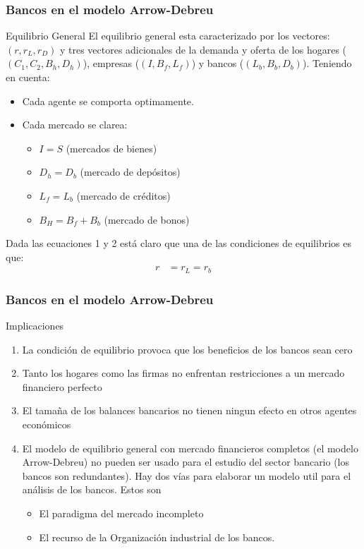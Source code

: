 \begin{frame}
    \frametitle{{\normalsize Bancos en el modelo Arrow-Debreu} {}}
    \begin{block} {Equilibrio General}
    El equilibrio general esta caracterizado por los vectores: $ (r, r_{L}, r_{D}) $ y tres vectores adicionales de la demanda y oferta de los hogares ($(C_{1}, C_{2}, B_{h}, D_{h}) $), empresas ($(I, B_{f}, L_{f}) $) y bancos ($(L_{b}, B_{b}, D_{b}) $).
    Teniendo en cuenta:
    \begin{itemize}
        \item Cada agente se comporta optimamente.
        \item Cada mercado se clarea:
        \begin{itemize}
            \item $I=S$ (mercados de bienes)
            \item $D_{h}=D_{b} $ (mercado de depósitos)
            \item $L_{f}=L_{b} $ (mercado de créditos)
            \item $B_{H}=B_{f}+B_{b}$ (mercado de bonos)
        \end{itemize}
    \end{itemize}
   {\footnotesize Dada las ecuaciones 1 y 2 está claro que una de las condiciones de equilibrios es que:
   \begin{align}
   r&=r_{L}=r_{b}
   \end{align} }
    \end{block}	
\end{frame}



\begin{frame}
    \frametitle{{\normalsize Bancos en el modelo Arrow-Debreu} {}}
    \begin{block} {Implicaciones}
        \begin{enumerate}
            \item La condición de equilibrio provoca que los beneficios de los bancos sean cero 
            \item Tanto los hogares como las firmas no enfrentan restricciones a un mercado financiero perfecto
           \item El tamaña de los balances bancarios no tienen ningun efecto en otros agentes económicos
           \item El modelo de equilibrio general con mercado financieros completos (el modelo Arrow-Debreu) no pueden ser usado para el estudio del sector bancario (los bancos son redundantes). Hay dos vías para elaborar un modelo util para el análisis de los bancos. Estos son
           \begin{itemize}
               \item El paradigma del mercado incompleto
               \item El recurso de la Organización industrial de los bancos.
           \end{itemize}
        \end{enumerate}
     
    \end{block}	
\end{frame}
